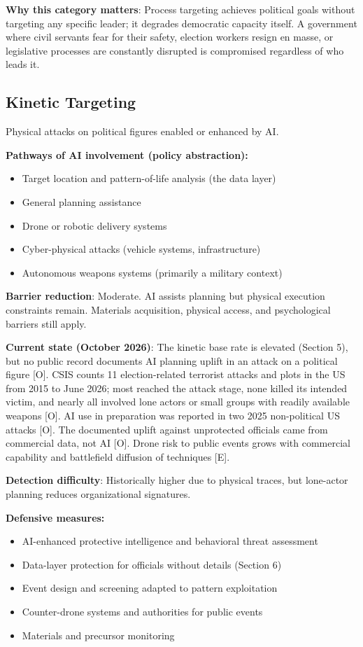 \documentclass[11pt,letterpaper]{article}
\begin{document}
\textbf{Why this category matters}: Process targeting achieves political goals without targeting any specific leader; it degrades democratic capacity itself. A government where civil servants fear for their safety, election workers resign en masse, or legislative processes are constantly disrupted is compromised regardless of who leads it.

\subsection{Kinetic Targeting}

Physical attacks on political figures enabled or enhanced by AI.

\textbf{Pathways of AI involvement (policy abstraction):}
\begin{itemize}
  \item Target location and pattern-of-life analysis (the data layer)
  \item General planning assistance
  \item Drone or robotic delivery systems
  \item Cyber-physical attacks (vehicle systems, infrastructure)
  \item Autonomous weapons systems (primarily a military context)
\end{itemize}

\textbf{Barrier reduction}: Moderate. AI assists planning but physical execution constraints remain. Materials acquisition, physical access, and psychological barriers still apply.

\textbf{Current state (October 2026)}: The kinetic base rate is elevated (Section 5), but no public record documents AI planning uplift in an attack on a political figure [O]. CSIS counts 11 election-related terrorist attacks and plots in the US from 2015 to June 2026; most reached the attack stage, none killed its intended victim, and nearly all involved lone actors or small groups with readily available weapons [O]. AI use in preparation was reported in two 2025 non-political US attacks [O]. The documented uplift against unprotected officials came from commercial data, not AI [O]. Drone risk to public events grows with commercial capability and battlefield diffusion of techniques [E].

\textbf{Detection difficulty}: Historically higher due to physical traces, but lone-actor planning reduces organizational signatures.

\textbf{Defensive measures:}
\begin{itemize}
  \item AI-enhanced protective intelligence and behavioral threat assessment
  \item Data-layer protection for officials without details (Section 6)
  \item Event design and screening adapted to pattern exploitation
  \item Counter-drone systems and authorities for public events
  \item Materials and precursor monitoring
\end{itemize}
\end{document}
